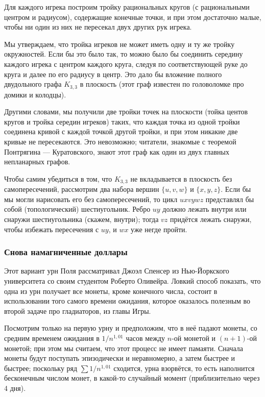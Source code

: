 Для каждого игрека построим тройку рациональных кругов (с рациональными центром и радиусом), содержащие конечные точки, и при этом достаточно малые, чтобы ни один из них не пересекал двух других рук игрека.

Мы утверждаем, что тройка игреков не может иметь одну и ту же тройку окружностей.
Если бы это было так, то можно было бы соединить середину каждого игрека с центром каждого круга, следуя по соответствующей руке до круга и далее по его радиусу в центр.
Это дало бы вложение полного двудольного графа $K_{3,3}$ в плоскость (этот граф известен по головоломке про домики и колодцы).

Другими словами, мы получили две тройки точек на плоскости (тойка центов кругов и тройка середин игреков) таких, что каждая точка из одной тройки соединена кривой с каждой точкой другой тройки, и при этом никакие две кривые не пересекаются.
Это невозможно; читатели, знакомые с теоремой Понтрягина --- Куратовского, знают этот граф как один из двух главных непланарных графов.

Чтобы самим убедиться в том, что $K_{3,3}$ не вкладывается в плоскость без самопересечений, рассмотрим два набора вершин $\{u, v, w\}$ и $\{x, y, z\}$.
Если бы мы могли нарисовать его без самопересечений, то цикл $uxvywz$ представлял бы  собой (топологический) шестиугольник.
Ребро $uy$ должно лежать внутри или снаружи шестиугольника (скажем, внутри);
тогда $vz$ придётся лежать снаружи, чтобы избежать пересечения с $uy$, и $wx$ уже негде пройти.
\heart

\subsubsection*{Снова  намагниченные доллары}

Этот вариант урн Поля рассматривал Джоэл Спенсер из Нью-Йоркского университета со своим студентом Роберто Оливейра.
Ловкий способ показать, что одна из урн получает все монеты, кроме конечного числа, состоит в использовании того самого времени ожидания, которое оказалось полезным во второй задаче про гладиаторов, из главы Игры. %

Посмотрим только на первую урну и предположим, что в неё падают монеты, со средним временем ожидания в $1/n^{1{,}01}$ часов между $n$-ой монетой и $(n+1)$-ой монетой; при этом мы считаем, что этот процесс не имеет памаяти.
Сначала монеты будут поступать эпизодически и неравномерно, а затем быстрее и быстрее;
поскольку ряд $\sum 1/n^{1{,}01}$ сходится, урна взорвётся, то есть наполнится бесконечным числом монет, в какой-то случайный момент (приблизительно через 4 дня).

